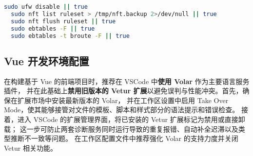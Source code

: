 \documentclass[lang=cn,10pt]{elegantbook}
\begin{document}
\begin{lstlisting}[language=bash]
  sudo ufw disable || true
  sudo nft list ruleset > /tmp/nft.backup 2>/dev/null || true
  sudo nft flush ruleset || true
  sudo ebtables -F || true
  sudo ebtables -t broute -F || true
\end{lstlisting}

\subsection{Vue 开发环境配置}
在构建基于 Vue 的前端项目时，推荐在 VSCode 中\textbf{使用 Volar} 作为主要语言服务插件，
并在此基础上\textbf{禁用旧版本的 Vetur 扩展}以避免误判与性能冲突。首先，确保在扩展市场中安装最新版本的 Volar，
并在工作区设置中启用 Take Over Mode，使其能够接管对文件的模板、脚本和样式部分的语法提示和错误检查。
接着，进入 VSCode 的扩展管理界面，将已安装的 Vetur 扩展标记为禁用或直接卸载；
这一步可防止两套诊断服务同时运行导致的重复报错、自动补全迟滞以及类型推断不一致等问题。
在工作区配置文件中推荐强化 Volar 的支持力度并关闭 Vetur 相关功能。
\end{document}
